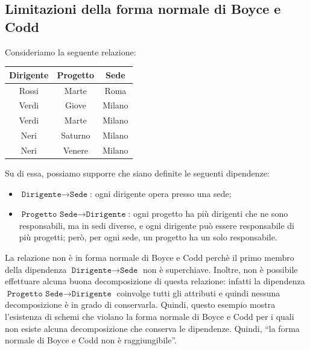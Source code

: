 \documentclass[12pt]{report}
\begin{document}
	\subsection{Limitazioni della forma normale di Boyce e Codd}
	Consideriamo la seguente relazione:
	\begin{center}
	\begin{tabular}{|c|c|c|}
		\hline
		Dirigente & Progetto & Sede \\
		\hline
		Rossi & Marte & Roma \\
		Verdi & Giove & Milano \\
		Verdi & Marte & Milano \\
		Neri & Saturno & Milano \\
		Neri & Venere & Milano \\
		\hline
	\end{tabular}
	\end{center}
	Su di essa, possiamo supporre che siano definite le seguenti dipendenze:
	\begin{itemize}
		\item $\texttt{Dirigente} \to \texttt{Sede}$: ogni dirigente opera presso una sede;
		\item $\texttt{Progetto Sede} \to \texttt{Dirigente}$: ogni progetto ha più dirigenti che ne sono responsabili, ma in sedi diverse, e ogni dirigente può essere responsabile di più progetti; però, per ogni sede, un progetto ha un solo responsabile.
	\end{itemize}
	La relazione non è in forma normale di Boyce e Codd perchè il primo membro della dipendenza $\texttt{Dirigente} \to \texttt{Sede}$ non è superchiave. Inoltre, non è possibile effettuare alcuna buona decomposizione di questa relazione: infatti la dipendenza $\texttt{Progetto Sede} \to \texttt{Dirigente}$ coinvolge tutti gli attributi e quindi nessuna decomposizione è in grado di conservarla. Quindi, questo esempio mostra l'esistenza di schemi che violano la forma normale di Boyce e Codd per i quali non esiste alcuna decomposizione che conserva le dipendenze. Quindi, ``la forma normale di Boyce e Codd non è raggiungibile''.
\end{document}
